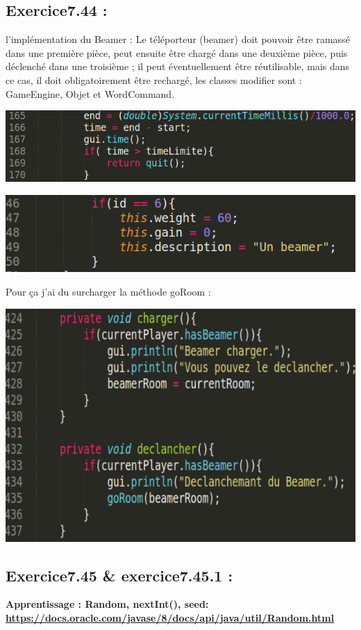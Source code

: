 \documentclass[french,10pt,a4paper]{report}
\begin{document}
\subsection{\textcolor{bb}{Exercice7.44 :}}
l’implémentation du Beamer :
Le téléporteur (beamer) doit pouvoir être ramassé dans une première pièce, peut ensuite être chargé dans une deuxième pièce, puis déclenché dans une troisième ; il peut éventuellement être réutilisable, mais dans ce cas, il doit obligatoirement être rechargé, les classes modifier sont : GameEngine, Objet et  WordCommand.
\begin{center}
	\includegraphics[scale=0.3]{captures/it4_2.png}
\end{center}
\begin{center}
	\includegraphics[scale=0.4]{captures/it4_3.png}
\end{center}
Pour ça j’ai du surcharger la méthode goRoom :
\begin{center}
	\includegraphics[scale=0.4]{captures/it4_4.png}
\end{center}

\subsection{\textcolor{bb}{Exercice7.45 \& exercice7.45.1 :}}
\textbf{\textcolor{gg}{Apprentissage : Random, nextInt(), seed:}\\ 
\textcolor{bb}{\href{https://docs.oracle.com/javase/8/docs/api/java/util/Random.html}{https://docs.oracle.com/javase/8/docs/api/java/util/Random.html}}}
\end{document}
